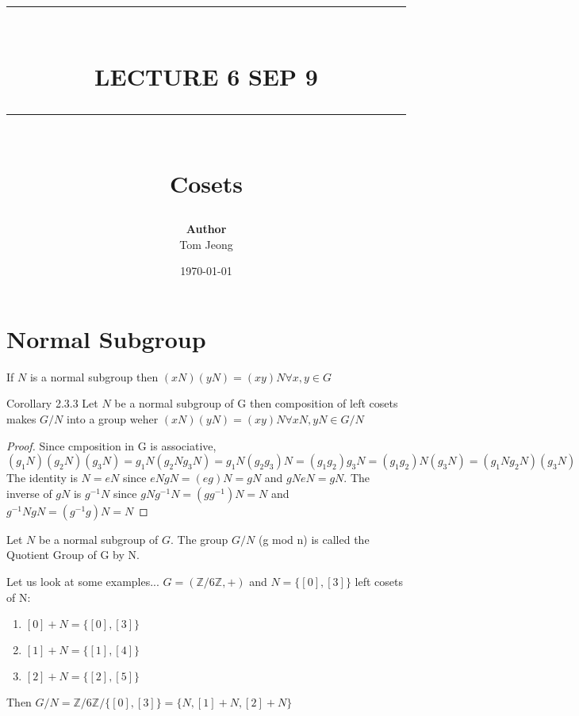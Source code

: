 \documentclass{article}
\newcommand{\HRule}[1]{\rule{\linewidth}{#1}}
\begin{document}

\title{ \normalsize \textsc{}
		\\ [2.0cm]
		\HRule{1.5pt} \\
		\LARGE \textbf{\uppercase{Lecture 6 sep 9}}
		\HRule{2.0pt} \\ [0.6cm] \LARGE{Cosets}
		}

\date{\today}
\author{\textbf{Author} \\ 
		Tom Jeong
        }

\maketitle
\newpage

\tableofcontents
\newpage

\section{Normal Subgroup}
\begin{proposition} 
 If $N$ is a normal subgroup then $(xN) (yN) = (xy) N \forall x,y \in G$ 
 \end{proposition}
 Corollary 2.3.3 Let $N$ be a normal subgroup of G then composition of left cosets makes $G / N $ into a group weher $(xN) (yN) = (xy)N \forall xN, yN \in G / N $
 \begin{proof}
     Since cmposition in G is associative, $(g_1N) (g_2N) (g_3N) = g_1N (g_2N g_3N) = g_1N (g_2 g_3) N = (g_1 g_2) g_3 N = (g_1 g_2) N (g_3 N) = (g_1 N g_2 N) (g_3 N)$
     The identity is $N = eN$ since $eN gN = (eg) N = gN $ and $gN eN = gN$. The inverse of $gN$ is $g^{-1} N$ since $gN g^{-1} N = (gg^{-1}) N = N$ and $g^{-1} N gN = (g^{-1} g) N = N$
    
 \end{proof}
\begin{definition}
    Let $N$ be a normal subgroup of $G$. The group $G / N $ (g mod n) is called the Quotient Group  of G by N. 
\end{definition}
Let us look at some examples... $G = (\mathbb{Z} / 6\mathbb{Z}, +)$ and $N = \{[0], [3]\}$  left cosets of N: 
\begin{enumerate}
    \item $[0] + N = \{[0], [3]\}$
    \item $[1] + N = \{[1], [4]\}$
    \item $[2] + N = \{[2], [5]\}$
    \end {enumerate}
    Then $ G / N = \mathbb{Z} / 6\mathbb{Z} / \{[0], [3]\} = \{ N, [1] + N, [2] + N\}$
\end{document}

